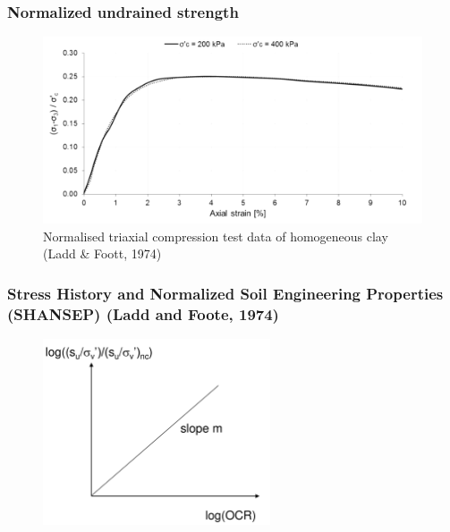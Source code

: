 \documentclass[notes]{beamer}
\begin{document}
\begin{frame}
\frametitle{Normalized undrained strength}
\begin{figure}
	\includegraphics[width=\textwidth]{figs/su_normalised.png}
	\caption*{Normalised triaxial compression test data of homogeneous clay (Ladd \& Foott, 1974)}
\end{figure}
\end{frame}


\begin{frame}
\frametitle{Stress History and Normalized Soil Engineering Properties (SHANSEP) (Ladd and Foote, 1974)}
\begin{figure}
	\includegraphics[width=0.6\textwidth]{figs/shansep.png}
\end{figure}
\end{frame}
\end{document}
